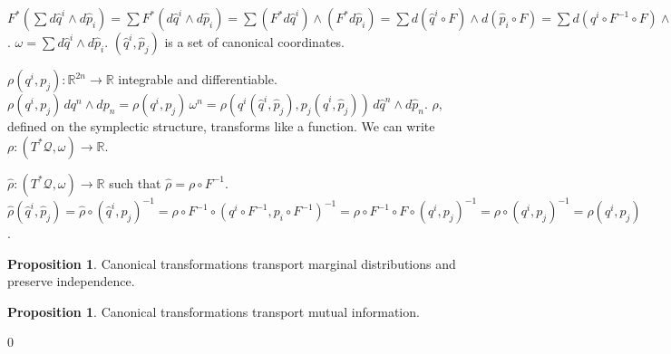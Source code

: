 \documentclass[smallextended]{svjour3}
\numberwithin{equation}{section}
\theoremstyle{definition}
\newtheorem{prop}[equation]{Proposition}
\begin{document}
$F^* (\sum d\hat{q}^i \wedge d\hat{p}_i) =\sum F^* (d\hat{q}^i \wedge d\hat{p}_i) =  \sum (F^* d\hat{q}^i)\wedge (F^* d\hat{p}_i) = \sum d(\hat{q}^i \circ F)\wedge d(\hat{p}_i \circ F) = \sum d(q^i \circ F^{-1} \circ F)\wedge d(p_i \circ F^{-1} \circ F) = \sum dq^i\wedge dp_i = \omega = F^* \omega$. $\omega =  \sum d\hat{q}^i \wedge d\hat{p}_i$. $(\hat{q}^i, \hat{p}_j)$ is a set of canonical coordinates.

$\rho(q^i, p_j) : \mathbb{R}^{2n} \rightarrow \mathbb{R}$ integrable and differentiable. $\rho (q^i, p_j) \, dq^n \wedge dp_n = \rho (q^i, p_j) \, \omega^n = \rho (q^i(\hat{q}^i, \hat{p}_j), p_j(\hat{q}^i, \hat{p}_j)) \, d\hat{q}^n \wedge d\hat{p}_n$. $\rho$, defined on the symplectic structure, transforms like a function. We can write $\rho : (T^*\mathcal{Q}, \omega) \rightarrow \mathbb{R}$.

$\hat{\rho} : (T^*\mathcal{Q}, \omega) \rightarrow \mathbb{R}$ such that $\hat{\rho} = \rho \circ F^{-1 }$. $\hat{\rho}(\hat{q}^i, \hat{p}_j) = \hat{\rho} \circ (\hat{q}^i, \hat{p}_j)^{-1} = \rho \circ F^{-1} \circ (q^i \circ F^{-1}, p_i \circ F^{-1}) ^ {-1}= \rho \circ F^{-1} \circ F \circ (q^i, p_j) ^ {-1} = \rho \circ (q^i, p_j) ^ {-1} = \rho (q^i, p_j)$.

\begin{prop}
	Canonical transformations transport marginal distributions and preserve independence.
\end{prop}

\begin{prop}
	Canonical transformations transport mutual information.
\end{prop}

\begin{thebibliography}{0}
	
\end{thebibliography}
\end{document}
